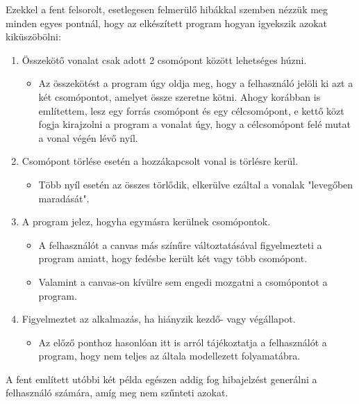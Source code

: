 Ezekkel a fent felsorolt, esetlegesen felmerülő hibákkal szemben nézzük meg minden egyes pontnál, hogy az elkészített program hogyan igyekszik azokat kiküszöbölni:

\begin{enumerate}
\item Összekötő vonalat csak adott 2 csomópont között lehetséges húzni.

\begin{itemize}
\item Az összekötést a program úgy oldja meg, hogy a felhasználó jelöli ki azt a két csomópontot, amelyet össze szeretne kötni. Ahogy korábban is említettem, lesz egy forrás csomópont és egy célcsomópont, e kettő közt fogja kirajzolni a program a vonalat úgy, hogy a célcsomópont felé mutat a vonal végén lévő nyíl.
\end{itemize}

\item Csomópont törlése esetén a hozzákapcsolt vonal is törlésre kerül.

\begin{itemize}
\item Több nyíl esetén az összes törlődik, elkerülve ezáltal a vonalak "levegőben maradását".
\end{itemize}

\item A program jelez, hogyha egymásra kerülnek csomópontok.

\begin{itemize}
\item A felhasználót a canvas más színűre változtatásával figyelmezteti a program amiatt, hogy fedésbe került két vagy több csomópont.
\item Valamint a canvas-on kívülre sem engedi mozgatni a csomópontot a program.
\end{itemize}

\item Figyelmeztet az alkalmazás, ha hiányzik kezdő- vagy végállapot.

\begin{itemize}
\item Az előző ponthoz hasonlóan itt is arról tájékoztatja a felhasználót a program, hogy nem teljes az általa modellezett folyamatábra.
\end{itemize}

\end{enumerate}

A fent említett utóbbi két példa egészen addig fog hibajelzést generálni a felhasználó számára, amíg meg nem szűnteti azokat.

